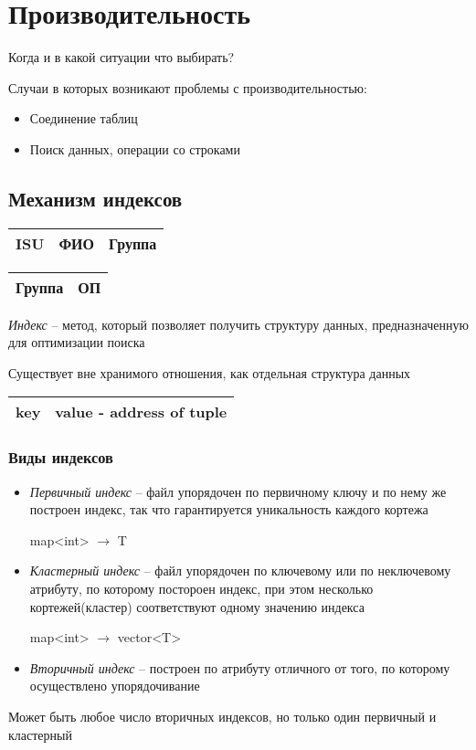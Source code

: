 \documentclass[12pt, a4paper]{article}
\begin{document}
\section{Производительность}
Когда и в какой ситуации что выбирать?

Случаи в которых возникают проблемы с производительностью:
\begin{itemize}
    \item Соединение таблиц
    \item Поиск данных, операции со строками
\end{itemize}

\subsection{Механизм индексов}

\begin{center}
    \begin{tabular}{|c|c|c|}
         \hline ISU & ФИО & Группа \\
         \hline 
    \end{tabular}
    \begin{tabular}{|c|c|}
         \hline Группа & ОП \\
         \hline
    \end{tabular}
\end{center}

\emph{Индекс} -- метод, который позволяет получить структуру данных, предназначенную для оптимизации поиска

Существует вне хранимого отношения, как отдельная структура данных

\begin{center}
    \begin{tabular}{|c|c|}
         \hline key & value - address of tuple \\
         \hline
    \end{tabular}
\end{center}


\subsubsection{Виды индексов}
\begin{itemize}
    \item \emph{Первичный индекс} -- файл упорядочен по первичному ключу и по нему же построен индекс, так что гарантируется уникальность каждого кортежа
    
    map<int> $\rightarrow$ T
    
    \item \emph{Кластерный индекс} -- файл упорядочен по ключевому или по неключевому атрибуту, по которому постороен индекс, при этом несколько кортежей(кластер) соответствуют одному значению индекса
    
    map<int> $\rightarrow$ vector<T>
    
    \item \emph{Вторичный индекс} -- построен по атрибуту отличного от того, по которому осуществлено упорядочивание 
\end{itemize}
Может быть любое число вторичных индексов, но только один первичный и кластерный
\end{document}

